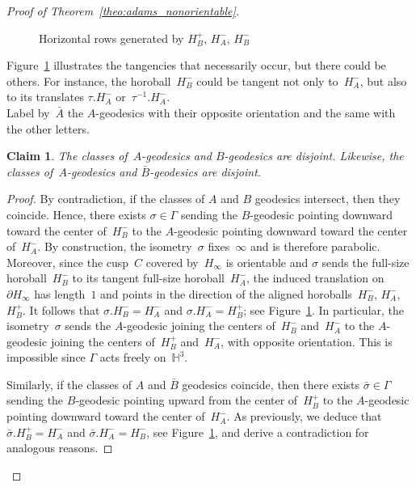 \documentclass[11pt,reqno]{amsart}
\newtheorem{claim}[theorem]{Claim}
\theoremstyle{definition}
\numberwithin{equation}{section}
\newcommand{\HH}{{\mathbb H}}
\numberwithin{equation}{section}
\begin{document}
\begin{proof}[Proof of Theorem~\ref{theo:adams_nonorientable}]
\medskip

\begin{figure}[htbp!]
\centering
\vspace*{2.5cm}
\def\svgwidth{0.28\textheight}

\vspace*{0.3cm}
\caption{Horizontal rows generated by $H_B^+$, $H_A^-$, $H_B^-$} \label{fig:3}
\end{figure}

Figure~\ref{fig:3} illustrates the tangencies that necessarily occur, but there could be others.
For instance, the horoball~$H_B^-$ could be tangent not only to~$H_A^-$, but also to its translates $\tau.H_A^-$ or~$\tau^{-1}.H_A^-$. \\

Label by~$\bar{A}$ the $A$-geodesics with their opposite orientation and the same with the other letters.

\begin{claim} \label{claim:AB}
The classes of~$A$-geodesics and $B$-geodesics are disjoint.
Likewise, the classes of~$A$-geodesics and $\bar{B}$-geodesics are disjoint.
\end{claim}

\begin{proof}
By contradiction, if the classes of $A$ and $B$ geodesics intersect, then they coincide.
Hence, there exists $\sigma \in \Gamma$ sending the $B$-geodesic pointing downward toward the center of~$H_B^-$ to the $A$-geodesic pointing downward toward the center of~$H_A^-$.
By construction, the isometry~$\sigma$ fixes~$\infty$ and is therefore parabolic.
Moreover, since the cusp~$C$ covered by~$H_\infty$ is orientable and $\sigma$ sends the full-size horoball~$H_B^-$ to its tangent full-size horoball~$H_A^-$, the induced translation on~$\partial H_\infty$ has length~$1$ and points in the direction of the aligned horoballs~$H_B^-$, $H_A^-$, $H_B^+$.
It follows that $\sigma.H_B^-=H_A^-$ and $\sigma.H_A^-=H_B^+$; see Figure~\ref{fig:3}. 
In particular, the isometry~$\sigma$ sends the $A$-geodesic joining the centers of~$H_B^-$ and~$H_A^-$ to the $A$-geodesic joining the centers of~$H_B^+$ and~$H_A^-$, with opposite orientation.
This is impossible since $\Gamma$ acts freely on~$\HH^3$.

Similarly, if the classes of $A$ and $\bar{B}$ geodesics coincide, then there exists $\bar{\sigma} \in \Gamma$ sending the $B$-geodesic pointing upward from the center of~$H_B^+$ to the $A$-geodesic pointing downward toward the center of~$H_A^-$.
As previously, we deduce that $\bar{\sigma}.H_B^+=H_A^-$ and $\bar{\sigma}.H_A^-=H_B^-$, see Figure~\ref{fig:3}, and derive a contradiction for analogous reasons.
\end{proof}



\end{proof}
\end{document}
